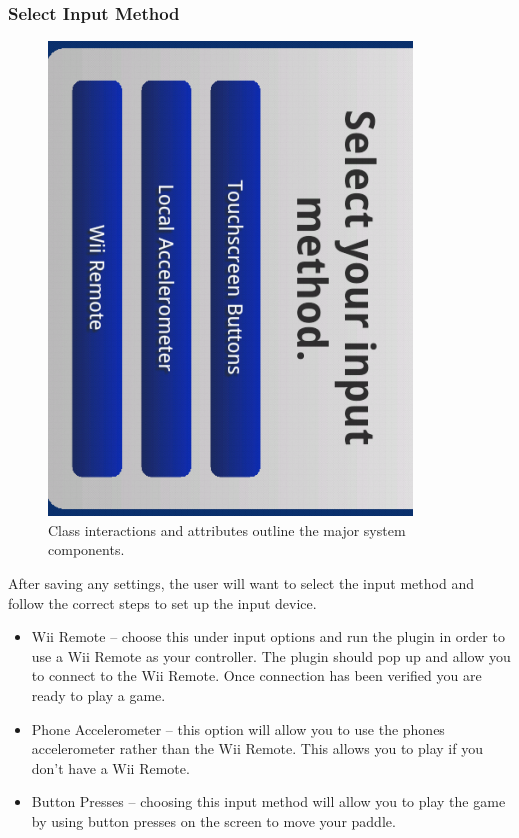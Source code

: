\documentclass[12pt]{article}
\begin{document}
\subsubsection{Select Input Method}
\begin{figure}
\begin{center}
\includegraphics[scale=.7]{ selectInputMethod-Android.png}
\caption{\label{domainModel}Class interactions and attributes outline the major system components.}
\end{center}
\end{figure}

After saving any settings, the user will want to select the input method and follow the correct steps to set up the input device.
\begin{itemize}
\item Wii Remote – choose this under input options and run the plugin in order to use a Wii Remote as your controller. The plugin should pop up and allow you to connect to the Wii Remote. Once connection has been verified you are ready to play a game.
\item Phone Accelerometer – this option will allow you to use the phones accelerometer rather than the Wii Remote. This allows you to play if you don’t have a Wii Remote.
\item Button Presses – choosing this input method will allow you to play the game by using button presses on the screen to move your paddle.
\end{itemize}
\end{document}
